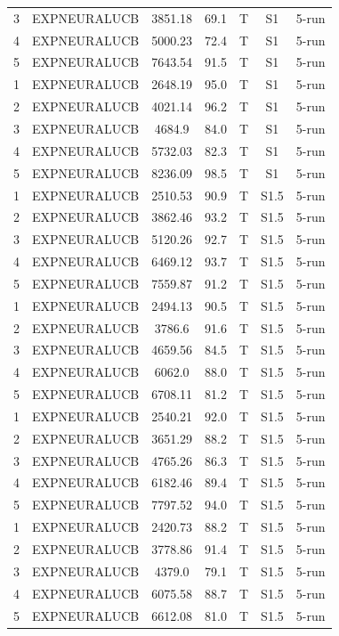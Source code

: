 \documentclass[11pt]{article}
\begin{document}
\begin{center}
\begin{longtable}{|c|c|c|c|c|c|c|}
3 & EXPNEURALUCB & 3851.18 & 69.1 & T & S1 & 5-run \\
4 & EXPNEURALUCB & 5000.23 & 72.4 & T & S1 & 5-run \\
5 & EXPNEURALUCB & 7643.54 & 91.5 & T & S1 & 5-run \\
1 & EXPNEURALUCB & 2648.19 & 95.0 & T & S1 & 5-run \\
2 & EXPNEURALUCB & 4021.14 & 96.2 & T & S1 & 5-run \\
3 & EXPNEURALUCB & 4684.9 & 84.0 & T & S1 & 5-run \\
4 & EXPNEURALUCB & 5732.03 & 82.3 & T & S1 & 5-run \\
5 & EXPNEURALUCB & 8236.09 & 98.5 & T & S1 & 5-run \\
1 & EXPNEURALUCB & 2510.53 & 90.9 & T & S1.5 & 5-run \\
2 & EXPNEURALUCB & 3862.46 & 93.2 & T & S1.5 & 5-run \\
3 & EXPNEURALUCB & 5120.26 & 92.7 & T & S1.5 & 5-run \\
4 & EXPNEURALUCB & 6469.12 & 93.7 & T & S1.5 & 5-run \\
5 & EXPNEURALUCB & 7559.87 & 91.2 & T & S1.5 & 5-run \\
1 & EXPNEURALUCB & 2494.13 & 90.5 & T & S1.5 & 5-run \\
2 & EXPNEURALUCB & 3786.6 & 91.6 & T & S1.5 & 5-run \\
3 & EXPNEURALUCB & 4659.56 & 84.5 & T & S1.5 & 5-run \\
4 & EXPNEURALUCB & 6062.0 & 88.0 & T & S1.5 & 5-run \\
5 & EXPNEURALUCB & 6708.11 & 81.2 & T & S1.5 & 5-run \\
1 & EXPNEURALUCB & 2540.21 & 92.0 & T & S1.5 & 5-run \\
2 & EXPNEURALUCB & 3651.29 & 88.2 & T & S1.5 & 5-run \\
3 & EXPNEURALUCB & 4765.26 & 86.3 & T & S1.5 & 5-run \\
4 & EXPNEURALUCB & 6182.46 & 89.4 & T & S1.5 & 5-run \\
5 & EXPNEURALUCB & 7797.52 & 94.0 & T & S1.5 & 5-run \\
1 & EXPNEURALUCB & 2420.73 & 88.2 & T & S1.5 & 5-run \\
2 & EXPNEURALUCB & 3778.86 & 91.4 & T & S1.5 & 5-run \\
3 & EXPNEURALUCB & 4379.0 & 79.1 & T & S1.5 & 5-run \\
4 & EXPNEURALUCB & 6075.58 & 88.7 & T & S1.5 & 5-run \\
5 & EXPNEURALUCB & 6612.08 & 81.0 & T & S1.5 & 5-run \\

\end{longtable}
\end{center}
\end{document}
